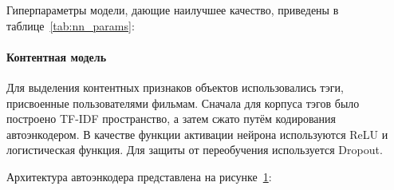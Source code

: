 Гиперпараметры модели, дающие наилучшее качество, приведены в таблице~\ref{tab:nn_params}:
\begin{table}[h]
    \caption{Гиперпараметры нейросети}
    \label{tab:nn_params}
\end{table}

\pagebreak
\paragraph{Контентная модель}
Для выделения контентных признаков объектов использовались тэги, присвоенные пользователями фильмам.
Сначала для корпуса тэгов было построено TF-IDF пространство, а затем сжато путём кодирования автоэнкодером.
В качестве функции активации нейрона используются ReLU и логистическая функция.
Для защиты от переобучения используется Dropout.

Архитектура автоэнкодера представлена на рисунке~\ref{fig:autoencoder}:
\begin{figure}[h!]
    \caption{}
    \label{fig:autoencoder}
\end{figure}

